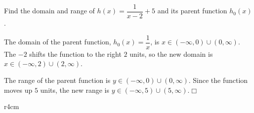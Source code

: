 \documentclass[../book.tex]{subfiles}
\begin{document}
\begin{example}
Find the domain and range of $h(x)=\dfrac{1}{x-2}+5$ and its parent function $h_0(x)$.
\end{example}
\begin{solution}
The domain of the parent function, $h_0(x)=\dfrac{1}{x}$, is $x\in(-\infty,0)\cup(0,\infty)$.  The $-2$ shifts the function to the right $2$ units, so the new domain is $x\in(-\infty,2)\cup(2,\infty)$.

The range of the parent function is $y\in(-\infty,0)\cup(0,\infty)$.  Since the function moves up $5$ units, the new range is $y\in(-\infty,5)\cup(5,\infty)$.$\Box$
\end{solution}

\begin{wrapfigure}{r}{4cm}
    \centering
\end{wrapfigure}
\end{document}
